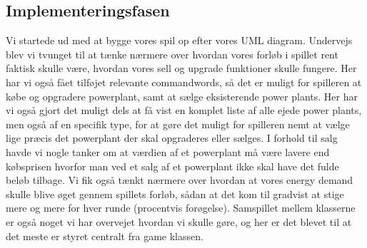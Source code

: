 \documentclass[a4paper,12pt]{report}
\begin{document}
\subsection{Implementeringsfasen}
Vi startede ud med at bygge vores spil op efter vores UML diagram.
Undervejs blev vi tvunget til at tænke nærmere over hvordan vores forløb i spillet rent faktisk skulle være, hvordan vores sell og upgrade funktioner skulle fungere. Her har vi også fået tilføjet relevante commandwords, så det er muligt for spilleren at købe og opgradere powerplant, samt at sælge eksisterende power plants. Her har vi også gjort det muligt dels at få vist en komplet liste af alle ejede power plants, men også af en specifik type, for at gøre det muligt for spilleren nemt at vælge lige præcis det powerplant der skal opgraderes eller sælges. I forhold til salg havde vi nogle tanker om at værdien af et powerplant må være lavere end købsprisen hvorfor man ved et salg af et powerplant ikke skal have det fulde beløb tilbage. Vi fik også tænkt nærmere over hvordan at vores energy demand skulle blive øget gennem spillets forløb, sådan at det kom til gradvist at stige mere og mere for hver runde (procentvis forøgelse). Samspillet mellem klasserne er også noget vi har overvejet hvordan vi skulle gøre, og her er det blevet til at det meste er styret centralt fra game klassen.




\end{document}
